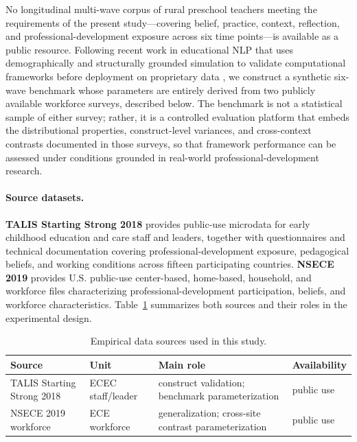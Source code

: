 \documentclass[pdflatex,sn-mathphys-num]{sn-jnl}%
\theoremstyle{thmstyleone}%
\theoremstyle{thmstyletwo}%
\theoremstyle{thmstylethree}%
\begin{document}
No longitudinal multi-wave corpus of rural preschool teachers meeting the requirements of the present study---covering belief, practice, context, reflection, and professional-development exposure across six time points---is available as a public resource. Following recent work in educational NLP that uses demographically and structurally grounded simulation to validate computational frameworks before deployment on proprietary data \cite{long2024dialogue,zhou2025longitudinal}, we construct a synthetic six-wave benchmark whose parameters are entirely derived from two publicly available workforce surveys, described below. The benchmark is not a statistical sample of either survey; rather, it is a controlled evaluation platform that embeds the distributional properties, construct-level variances, and cross-context contrasts documented in those surveys, so that framework performance can be assessed under conditions grounded in real-world professional-development research.

\paragraph{Source datasets.}
\textbf{TALIS Starting Strong 2018} provides public-use microdata for early childhood education and care staff and leaders, together with questionnaires and technical documentation covering professional-development exposure, pedagogical beliefs, and working conditions across fifteen participating countries. \textbf{NSECE 2019} provides U.S. public-use center-based, home-based, household, and workforce files characterizing professional-development participation, beliefs, and workforce characteristics. Table~\ref{tab:data} summarizes both sources and their roles in the experimental design.

\begin{table}[t]
\centering
\caption{Empirical data sources used in this study.}
\label{tab:data}
\begin{tabular}{llll}
\toprule
Source & Unit & Main role & Availability\\
\midrule
TALIS Starting Strong 2018 & ECEC staff/leader & construct validation; benchmark parameterization & public use\\
NSECE 2019 workforce & ECE workforce & generalization; cross-site contrast parameterization & public use\\
\bottomrule
\end{tabular}
\end{table}
\end{document}
